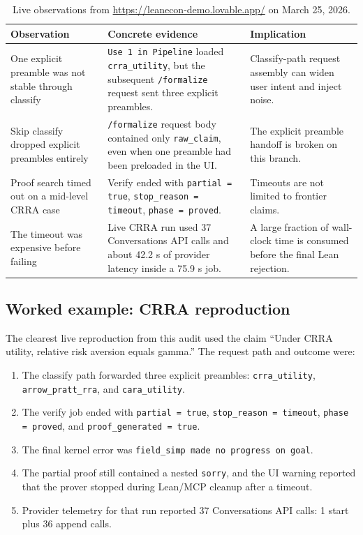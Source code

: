 \documentclass[11pt]{article}
\begin{document}
\begin{table}[htbp]
\centering
\small
\begin{tabularx}{\textwidth}{>{\raggedright\arraybackslash}p{} >{\raggedright\arraybackslash}p{} Y}
\toprule
Observation & Concrete evidence & Implication \\
\midrule
One explicit preamble was not stable through classify & \texttt{Use 1 in Pipeline} loaded \texttt{crra\_utility}, but the subsequent \texttt{/formalize} request sent three explicit preambles. & Classify-path request assembly can widen user intent and inject noise. \\
Skip classify dropped explicit preambles entirely & \texttt{/formalize} request body contained only \texttt{raw\_claim}, even when one preamble had been preloaded in the UI. & The explicit preamble handoff is broken on this branch. \\
Proof search timed out on a mid-level CRRA case & Verify ended with \texttt{partial = true}, \texttt{stop\_reason = timeout}, \texttt{phase = proved}. & Timeouts are not limited to frontier claims. \\
The timeout was expensive before failing & Live CRRA run used 37 Conversations API calls and about 42.2 s of provider latency inside a 75.9 s job. & A large fraction of wall-clock time is consumed before the final Lean rejection. \\
\bottomrule
\end{tabularx}
\caption{Live observations from \url{https://leanecon-demo.lovable.app/} on March 25, 2026.}
\end{table}

\subsection*{Worked example: CRRA reproduction}

The clearest live reproduction from this audit used the claim ``Under CRRA
utility, relative risk aversion equals gamma.'' The request path and outcome
were:

\begin{enumerate}[leftmargin=1.5em]
  \item The classify path forwarded three explicit preambles:
  \texttt{crra\_utility}, \texttt{arrow\_pratt\_rra}, and
  \texttt{cara\_utility}.
  \item The verify job ended with \texttt{partial = true},
  \texttt{stop\_reason = timeout}, \texttt{phase = proved}, and
  \texttt{proof\_generated = true}.
  \item The final kernel error was
  \texttt{field\_simp made no progress on goal}.
  \item The partial proof still contained a nested \texttt{sorry}, and the UI
  warning reported that the prover stopped during Lean/MCP cleanup after a timeout.
  \item Provider telemetry for that run reported 37 Conversations API calls:
  1 start plus 36 append calls.
\end{enumerate}
\end{document}
